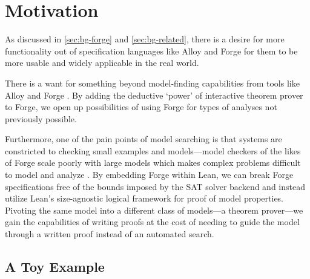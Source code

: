 \section{Motivation}\label{sec:motivation}

As discussed in \cref{sec:bg-forge} and \cref{sec:bg-related}, there is a desire for more functionality out of specification languages like Alloy and Forge for them to be more usable and widely applicable in the real world. 

There is a want for something beyond model-finding capabilities from tools like Alloy and Forge \cite{milicevic2014alpha}. By adding the deductive `power' of interactive theorem prover to Forge, we open up possibilities of using Forge for types of analyses not previously possible. 

Furthermore, one of the pain points of model searching is that systems are constricted to checking small examples and models---model checkers of the likes of Forge scale poorly with large models which makes complex problems difficult to model and analyze \cite{bagheri2016titanium,ringert2020semantic}. By embedding Forge within Lean, we can break Forge specifications free of the bounds imposed by the SAT solver backend and instead utilize Lean's size-agnostic logical framework for proof of model properties. Pivoting the same model into a different class of models---a theorem prover---we gain the capabilities of writing proofs at the cost of needing to guide the model through a written proof instead of an automated search.

\subsection{A Toy Example}\label{sec:toy-example}

